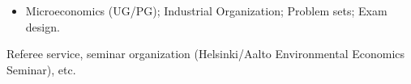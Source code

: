\begin{itemize}
\item Microeconomics (UG/PG); Industrial Organization; Problem sets; Exam design.
\end{itemize}




Referee service, seminar organization (Helsinki/Aalto Environmental Economics Seminar), etc.


